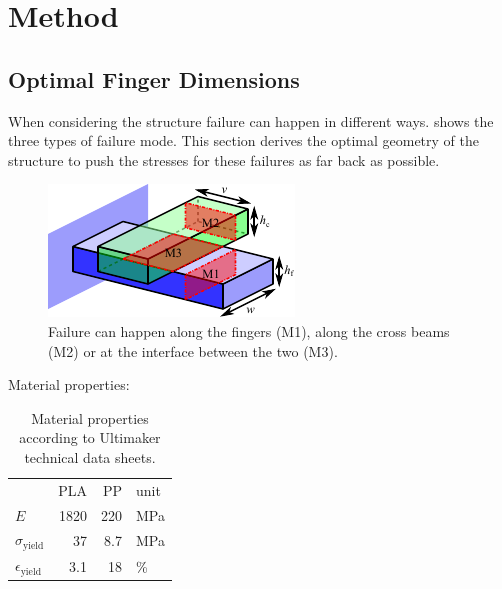 

\section{Method}


\newpage

\subsection{Optimal Finger Dimensions}
When considering the structure failure can happen in different ways.
 shows the three types of failure mode.
This section derives the optimal geometry of the structure to push the stresses for these failures as far back as possible.


\begin{figure}
	\centering
	\includegraphics[width=.75\columnwidth]{sources/method/failure_modes.pdf}
	\caption{Failure can happen along the fingers (M1), along the cross beams (M2) or at the interface between the two (M3).}
	\label{fig:failure_modes}
\end{figure}



Material properties:
\begin{table}[h!]
\centering
		\caption{Material properties according to Ultimaker technical data sheets.}
		\label{tab:mat_props}
	\begin{tabular}{lrrl}
		& PLA & PP & unit \\
		$E$ & {1820} &  {220} & \si{\mega\pascal} \\
		$\sigma_\text{yield}$ & {37}& {8.7} & \si{\mega\pascal} \\
		$\epsilon_\text{yield}$ & {3.1}& {18} & \si{\percent} \\
	\end{tabular}
\end{table}


